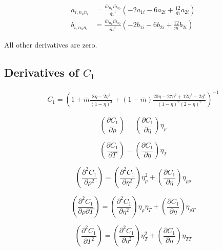\documentclass[internal,english]{sintefmemo2012}
\newcommand*{\pder}[2]{\left(\frac{\partial #1}{\partial #2}\right)}
\newcommand*{\pdder}[2]{\left(\frac{\partial^2 #1}{\partial #2^2}\right)}
\newcommand*{\pdcross}[3]{\left(\frac{\partial^2 #1}{\partial #2 \partial #3}\right)}
\newcommand{\lp}{\left(}
\newcommand{\rp}{\right)}
\begin{document}
\begin{align}
  a_{i,n_k n_l} &= \frac{\bar m_{n_k} \bar m_{n_l}}{\bar m^3} \lp -2 a_{1i} - 6 a_{2i} + \frac{12}{\bar m} a_{2i} \rp \\
  b_{i,n_k n_l} &= \frac{\bar m_{n_k} \bar m_{n_l}}{\bar m^3} \lp -2 b_{1i} - 6 b_{2i} + \frac{12}{\bar m} b_{2i} \rp
\end{align}

All other derivatives are zero.

\subsection{Derivatives of $C_1$}
\begin{align}
  C_1 = \lp 1 + \bar m \frac{8\eta-2\eta^2}{(1-\eta)^4} + (1-\bar m) \frac{20\eta-27\eta^2+12\eta^3-2\eta^4}{(1-\eta)^2(2-\eta)^2} \rp^{-1}
\end{align}

\begin{equation}
  \pder{C_1}{\rho} = \pder{C_1}{\eta} \eta_{\rho}
\end{equation}

\begin{equation}
  \pder{C_1}{T} = \pder{C_1}{\eta}\eta_{T}
\end{equation}


\begin{equation}
  \pdder{C_1}{\rho} = \pdder{C_1}{\eta}\eta_{\rho}^2 + \pder{C_1}{\eta}\eta_{\rho\rho}
\end{equation}

\begin{equation}
  \pdcross{C_1}{\rho}{T} = \pdder{C_1}{\eta} \eta_{\rho} \eta_{T} + \pder{C_1}{\eta}\eta_{\rho T}
\end{equation}


\begin{equation}
  \pdder{C_1}{T} = \pdder{C_1}{\eta}\eta_{T}^2 + \pder{C_1}{\eta}\eta_{TT}
\end{equation}
\end{document}

